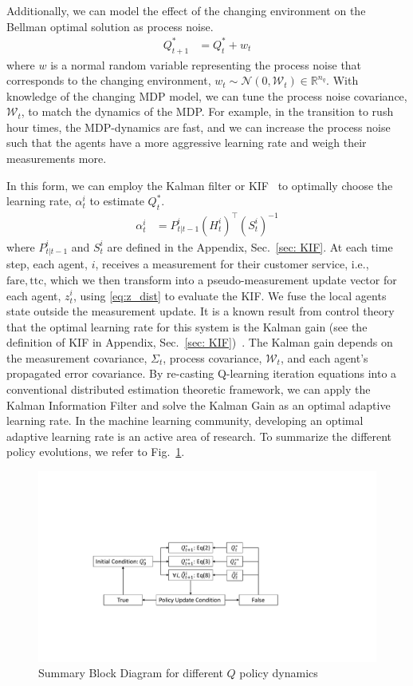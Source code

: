 \documentclass[journal]{IEEEtran}
\newcommand{\ttc}{\mathrm{ttc}}
\begin{document}
Additionally, we can model the effect of the changing environment on the Bellman optimal solution as process noise. 
\begin{align}
    Q^{*}_{t+1} &= Q^{*}_{t} + w_t \nonumber 
\end{align} 
where $w$ is a normal random variable representing the process noise that corresponds to the changing environment, $w_t \sim \mathcal{N}(0,\mathcal{W}_t) \in \mathbb{R}^{n_q}$. With knowledge of the changing MDP model, we can tune the process noise covariance, $\mathcal{W}_t$, to match the dynamics of the MDP. For example, in the transition to rush hour times, the MDP-dynamics are fast, and we can increase the process noise such that the agents have a more aggressive learning rate and weigh their measurements more. 

In this form, we can employ the Kalman filter or KIF~\cite{DBF} to optimally choose the learning rate, $\alpha^i_t$ to estimate $Q_t^{*}$. 
\begin{align}
    \label{eq:optimal_alpha}
    \alpha^i_t &= P^i_{t|t-1} (H^i_t)^\intercal (S^i_t)^{-1}
\end{align}
where $P^i_{t|t-1}$ and $S^i_t$ are defined in the Appendix, Sec.~\ref{sec: KIF}. At each time step, each agent, $i$, receives a measurement for their customer service, i.e., $\mathrm{fare}, \ttc$, which we then transform into a pseudo-measurement update vector for each agent, $z^i_t$, using \eqref{eq:z_dist} to evaluate the KIF. We fuse the local agents state outside the measurement update. It is a known result from control theory that the optimal learning rate for this system is the Kalman gain (see the definition of KIF in Appendix, Sec.~\ref{sec: KIF})~\cite{saberFax2007,saber_2009}. The Kalman gain depends on the measurement covariance, $\Sigma_t$, process covariance, $\mathcal{W}_t$, and each agent's propagated error covariance. By re-casting Q-learning iteration equations into a conventional distributed estimation theoretic framework, we can apply the Kalman Information Filter and solve the Kalman Gain as an optimal adaptive learning rate. In the machine learning community, developing an optimal adaptive learning rate is an active area of research. To summarize the different policy evolutions, we refer to Fig.~\ref{fig:diff_q}.
\begin{figure}
    \centering
    \includegraphics[scale = 0.4, trim={4cm 5cm 5cm 4cm}, clip]{different_q_block_diagram.pdf}
    \caption{Summary Block Diagram for different $Q$ policy dynamics}
    \label{fig:diff_q}
\end{figure}
\end{document}

